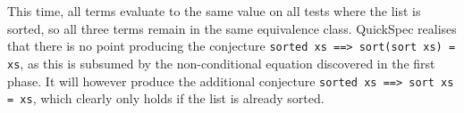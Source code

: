 \noindent This time, all terms evaluate to the same value on all tests where the list is sorted, so all three terms remain in the same equivalence class. QuickSpec realises that there is no point producing the conjecture \texttt{sorted xs ==> sort(sort xs) = xs}, as this is subsumed by the non-conditional equation discovered in the first phase. It will however produce the additional conjecture \texttt{sorted xs ==> sort xs = xs}, which clearly only holds if the list is already sorted.